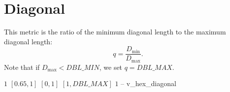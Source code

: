 \section{Diagonal}

This metric is the ratio of the minimum diagonal length to the maximum diagonal length:
\[
q = \frac{D_{\min}}{ D_{\max}}.
\]
Note that if $D_{\max} < DBL\_MIN$, we set $q = DBL\_MAX$.

%
{$1$}%
{$[0.65,1]$}%
{$[0,1]$}%
{$[1,DBL\_MAX]$}%
{$1$}%
{--}%
{v\_hex\_diagonal}%
